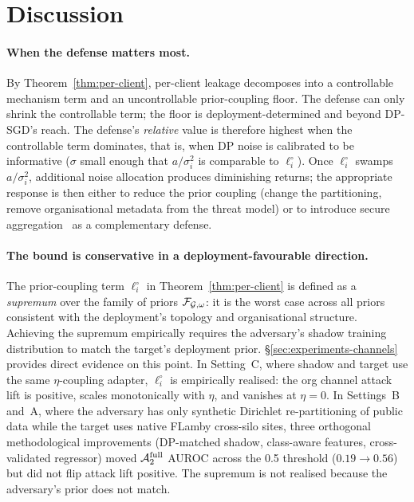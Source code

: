 \section{Discussion}
\label{sec:discussion}

\paragraph{When the defense matters most.}
By Theorem~\ref{thm:per-client}, per-client leakage decomposes into a
controllable mechanism term and an uncontrollable prior-coupling floor.
The defense can only shrink the controllable term; the floor is
deployment-determined and beyond DP-SGD's reach. The defense's
\emph{relative} value is therefore highest when the controllable term
dominates, that is, when DP noise is calibrated to be informative
($\sigma$ small enough that $a/\sigma_i^2$ is comparable to
$\ell_i^\circ$). Once $\ell_i^\circ$ swamps $a/\sigma_i^2$, additional
noise allocation produces diminishing returns; the appropriate response
is then either to reduce the prior coupling (change the partitioning,
remove organisational metadata from the threat model) or to introduce
secure aggregation~\cite{bonawitz2017secagg} as a complementary
defense.

\paragraph{The bound is conservative in a deployment-favourable
direction.}
The prior-coupling term $\ell_i^\circ$ in Theorem~\ref{thm:per-client}
is defined as a \emph{supremum} over the family of priors
$\mathcal{F}_{\mathcal{G},\omega}$: it is the worst case across all priors
consistent with the deployment's topology and organisational structure.
Achieving the supremum empirically requires the adversary's shadow
training distribution to match the target's deployment prior.
\S\ref{sec:experiments-channels} provides direct evidence on this
point. In Setting~C, where shadow and target use the same
$\eta$-coupling adapter, $\ell_i^\circ$ is empirically realised: the
org channel attack lift is positive, scales monotonically with $\eta$,
and vanishes at $\eta = 0$. In Settings~B and~A, where the adversary
has only synthetic Dirichlet re-partitioning of public data while the
target uses native FLamby cross-silo sites, three orthogonal
methodological improvements (DP-matched shadow, class-aware features,
cross-validated regressor) moved $\mathcal{A}_2^{\text{full}}$ AUROC across
the 0.5 threshold ($0.19 \to 0.56$) but did not flip attack lift
positive. The supremum is not realised because the adversary's prior
does not match.

